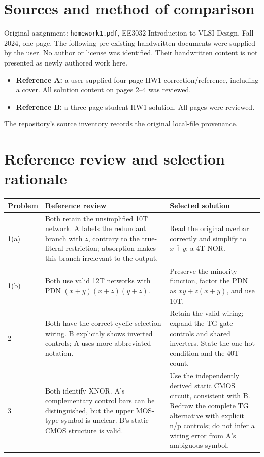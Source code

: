\documentclass[11pt,a4paper]{article}
\begin{document}
\section*{Sources and method of comparison}
Original assignment: \texttt{homework1.pdf}, EE3032 Introduction to VLSI Design,
Fall 2024, one page. The following pre-existing handwritten documents
were supplied by the user. No author or license was identified. Their handwritten
content is not presented as newly authored work here.
\begin{itemize}
 \item \textbf{Reference A:} a user-supplied four-page HW1 correction/reference,
 including a cover. All solution content on pages 2--4 was reviewed.
 \item \textbf{Reference B:} a three-page student HW1 solution. All pages were reviewed.
\end{itemize}
The repository's source inventory records the original local-file provenance.

\newpage
\section*{Reference review and selection rationale}
\begin{tabular}{p{.09\linewidth}p{.39\linewidth}p{.43\linewidth}}\toprule
Problem&Reference review&Selected solution\\\midrule
1(a)&Both retain the unsimplified 10T network. A labels the redundant branch
with $\bar z$, contrary to the true-literal restriction; absorption makes this
branch irrelevant to the output.&
Read the original overbar correctly and simplify to $\overline{x+y}$: a 4T NOR.\\
1(b)&Both use valid 12T networks with PDN $(x+y)(x+z)(y+z)$.&
Preserve the minority function, factor the PDN as $xy+z(x+y)$, and use 10T.\\
2&Both have the correct cyclic selection wiring. B explicitly shows inverted
controls; A uses more abbreviated notation.&
Retain the valid wiring; expand the TG gate controls and shared inverters.
State the one-hot condition and the 40T count.\\
3&Both identify XNOR. A's complementary control bars can be distinguished, but
the upper MOS-type symbol is unclear. B's static CMOS structure is valid.&
Use the independently derived static CMOS circuit, consistent with B. Redraw
the complete TG alternative with explicit n/p controls; do not infer a wiring
error from A's ambiguous symbol.\\\bottomrule
\end{tabular}
\end{document}
